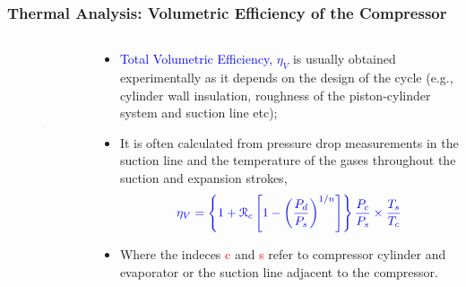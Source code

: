 \documentclass[10pt,compress]{beamer}
\newcommand{\frc}{\displaystyle\frac}
\begin{document}
\begin{frame}
 \frametitle{Thermal Analysis: Volumetric Efficiency of the Compressor}
 \begin{columns}
  \begin{column}[c]{0.35\linewidth}
   \begin{figure}%
      \includegraphics[width=4.5cm,height=4.5cm,clip]{./Pics/Overview_Refrig29}
   \end{figure}  
  \end{column}  
  \begin{column}[c]{0.65\linewidth}
   \begin{itemize}
    \item <1-> \textcolor{blue}{Total Volumetric Efficiency, $\eta_{V}$} is usually obtained experimentally as it depends on the design of the cycle (e.g., cylinder wall insulation, roughness of the piston-cylinder system and suction line etc);
    \item <2-> It is often calculated from pressure drop measurements in the suction line and the temperature of the gases throughout the suction and expansion strokes,
     \begin{displaymath}
      \textcolor{blue}{\eta_{V} = \left\{1+\mathcal{R}_{c}\left[1-\left(\frc{P_{d}}{P_{s}}\right)^{1/n}\right]\right\} \frc{P_{c}}{P_{s}}\times\frc{T_{s}}{T_{c}}}
     \end{displaymath}
    \item <3-> Where the indeces \textcolor{red}{c} and \textcolor{red}{s} refer to compressor cylinder and evaporator or the suction line adjacent to the compressor.

   \end{itemize}
  \end{column}  
 \end{columns}
\end{frame}
\end{document}
